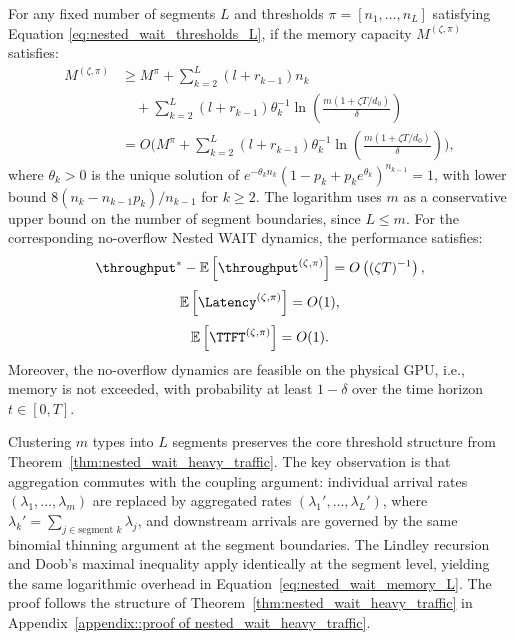 \begin{theorem}
\label{thm:nested_wait_heavy_traffic, any segment}
For any fixed number of segments $L$ and thresholds $\pi = [n_1, \dots, n_L]$ satisfying Equation \eqref{eq:nested_wait_thresholds_L}, if the memory capacity $M^{(\zeta, \pi)}$ satisfies:
\begin{equation}
    \label{eq:nested_wait_memory_L}
    \begin{aligned}
M^{(\zeta, \pi)}
&\geq M^\pi
	+ \sum_{k=2}^L (l + r_{k-1}) n_k \\
&\quad
+ \sum_{k=2}^L (l + r_{k-1}) \theta_k^{-1}
\ln\left( \frac{m(1+\zeta T/d_0)}{\delta} \right) \\
&= O\biggl( M^\pi
+ \sum_{k=2}^L (l + r_{k-1}) \theta_k^{-1}
\ln\left( \frac{m(1+\zeta T/d_0)}{\delta} \right) \biggr),
    \end{aligned}
\end{equation}
where $\theta_k>0$ is the unique solution of \(e^{-\theta_k n_k}(1-p_k+p_ke^{\theta_k})^{n_{k-1}}=1\), with lower bound $8(n_k-n_{k-1}p_k)/n_{k-1}$ for \(k\ge2\). The logarithm uses \(m\) as a conservative upper bound on the number of segment boundaries, since \(L\le m\).
For the corresponding no-overflow Nested WAIT dynamics, the performance satisfies:
$$\throughput^* - \mathbb{E}\left[ \throughput^{(\zeta, \pi)} \right] = O\left( (\zeta T)^{-1} \right),$$
$$\mathbb{E}\left[ \Latency^{(\zeta, \pi)} \right] = O(1),$$
$$\mathbb{E}\left[ \TTFT^{(\zeta, \pi)} \right] = O(1).$$
Moreover, the no-overflow dynamics are feasible on the physical GPU, i.e., memory is not exceeded, with probability at least \( 1 - \delta \) over the time horizon \(t \in [0,T]\).
\end{theorem}

Clustering $m$ types into $L$ segments preserves the core threshold structure from Theorem~\ref{thm:nested_wait_heavy_traffic}. The key observation is that aggregation commutes with the coupling argument: individual arrival rates $(\lambda_1, \dots, \lambda_m)$ are replaced by aggregated rates $(\lambda_1', \dots, \lambda_L')$, where $\lambda_k' = \sum_{j \in \text{segment } k} \lambda_j$, and downstream arrivals are governed by the same binomial thinning argument at the segment boundaries. The Lindley recursion and Doob's maximal inequality apply identically at the segment level, yielding the same logarithmic overhead in Equation~\eqref{eq:nested_wait_memory_L}. The proof follows the structure of Theorem~\ref{thm:nested_wait_heavy_traffic} in Appendix~\ref{appendix::proof of nested_wait_heavy_traffic}.


